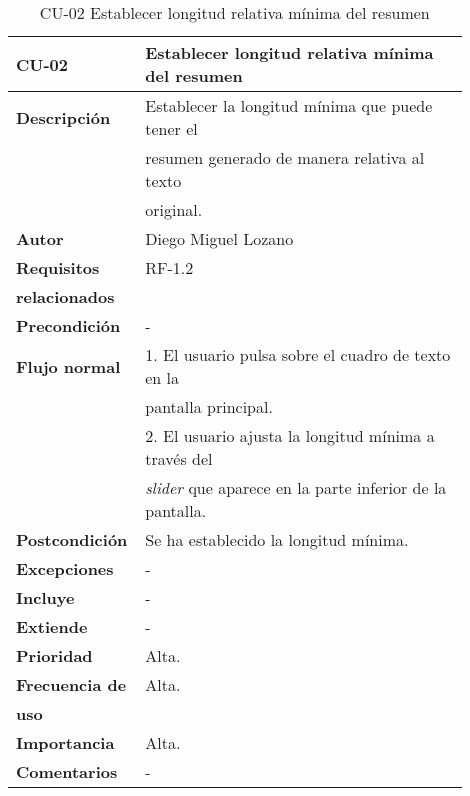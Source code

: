 \begin{longtable}{>{\raggedright}b{0.2\linewidth}>{\raggedright\arraybackslash}b{0.7\linewidth}}
	\toprule
	\textbf{CU-02} & \textbf{Establecer longitud relativa mínima del resumen} \\
	\toprule
	\endhead
	
	\toprule
	\caption{CU-02 Establecer longitud relativa mínima del resumen}
	\endfoot
	
	\small{\textbf{Descripción}} & Establecer la longitud mínima que puede tener el \\
	& resumen generado de manera relativa al texto \\ & original. \\
	\small{\textbf{Autor}} & Diego Miguel Lozano \\
	\small{\textbf{Requisitos}} & RF-1.2  \\
	\small{\textbf{relacionados}} & \\
	\small{\textbf{Precondición}} & - \\
	\small{\textbf{Flujo normal}} & \quad \small{1. El usuario pulsa sobre el cuadro de texto en la} \\
	& \qquad \small{pantalla principal.} \\
	& \quad \small{2. El usuario ajusta la longitud mínima a través del} \\
	& \qquad \small{\emph{slider} que aparece en la parte inferior de la pantalla.} \\
	\small{\textbf{Postcondición}} & Se ha establecido la longitud mínima. \\
	\small{\textbf{Excepciones}} & - \\
	\small{\textbf{Incluye}} & - \\
	\small{\textbf{Extiende}} & - \\
	\small{\textbf{Prioridad}} & Alta. \\
	\small{\textbf{Frecuencia de}} & Alta. \\
	\small{\textbf{uso}} & \\
	\small{\textbf{Importancia}} & Alta. \\
	\small{\textbf{Comentarios}} &  - \\
\end{longtable}

